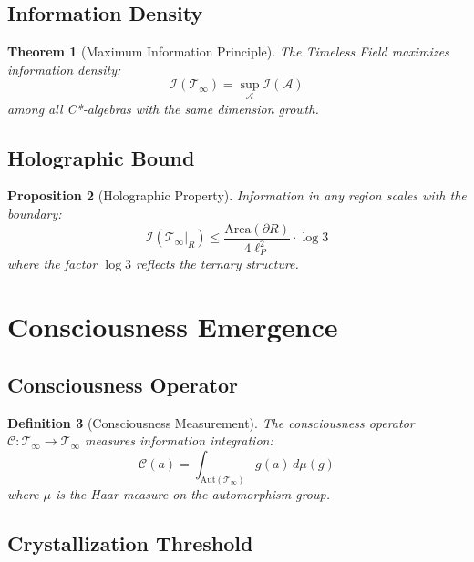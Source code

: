\documentclass[12pt,letterpaper]{article}
\newcommand{\timelessfield}{\mathcal{T}_\infty}
\newtheorem{theorem}{Theorem}[section]
\newtheorem{proposition}[theorem]{Proposition}
\newtheorem{definition}[theorem]{Definition}
\begin{document}
\subsection{Information Density}

\begin{theorem}[Maximum Information Principle]
The Timeless Field maximizes information density:
\begin{equation}
\mathcal{I}(\timelessfield) = \sup_{\mathcal{A}} \mathcal{I}(\mathcal{A})
\end{equation}
among all C*-algebras with the same dimension growth.
\end{theorem}

\subsection{Holographic Bound}

\begin{proposition}[Holographic Property]
Information in any region scales with the boundary:
\begin{equation}
\mathcal{I}(\timelessfield|_R) \leq \frac{\text{Area}(\partial R)}{4\ell_P^2} \cdot \log 3
\end{equation}
where the factor $\log 3$ reflects the ternary structure.
\end{proposition}

\section{Consciousness Emergence}

\subsection{Consciousness Operator}

\begin{definition}[Consciousness Measurement]
The consciousness operator $\mathcal{C}: \timelessfield \to \timelessfield$ measures information integration:
\begin{equation}
\mathcal{C}(a) = \int_{\text{Aut}(\timelessfield)} g(a) \, d\mu(g)
\end{equation}
where $\mu$ is the Haar measure on the automorphism group.
\end{definition}

\subsection{Crystallization Threshold}
\end{document}
